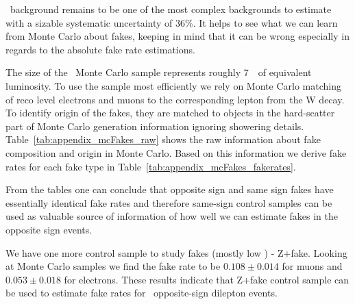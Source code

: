 \wjets\ background remains to be one of the most complex backgrounds to estimate
with a sizable systematic uncertainty of 36\%. It helps to see what we
can learn from Monte Carlo about fakes, keeping in mind that it can be
wrong especially in regards to the absolute fake rate estimations.

The size of the \wjets\ Monte Carlo sample represents roughly 7~\ifb\
of equivalent luminosity. To use the sample most efficiently we rely
on Monte Carlo matching of reco level electrons and muons to the
corresponding lepton from the W decay. To identify origin of the
fakes, they are matched to objects in the hard-scatter part of Monte
Carlo generation information ignoring showering
details. Table~\ref{tab:appendix_mcFakes_raw} shows the raw
information about fake composition and origin in Monte Carlo. Based on
this information we derive fake rates for each fake type in
Table~\ref{tab:appendix_mcFakes_fakerates}. 

From the tables one can conclude that opposite sign and same sign
fakes have essentially identical fake rates and therefore same-sign
control samples can be used as valuable source of information of how
well we can estimate fakes in the opposite sign events. 

We have one more control sample to study fakes (mostly low \pt{}) -
Z+fake. Looking at Monte Carlo samples we find the fake rate to be
$0.108\pm0.014$ for muons and $0.053\pm0.018$ for electrons. These
results indicate that Z+fake control sample can be used to estimate
fake rates for \wjets\ opposite-sign dilepton events.

